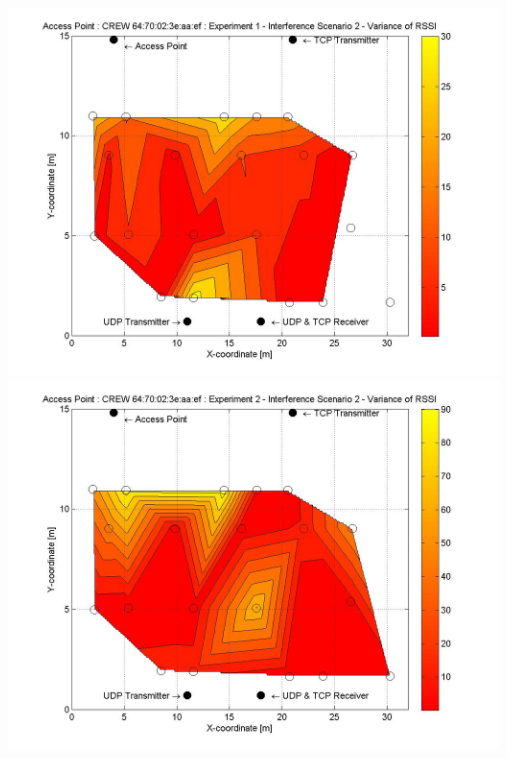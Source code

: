 \documentclass[11pt,a4paper,headinclude,footinclude,chapterprefix=on]{scrreprt}
\begin{document}
\begin{longtable}
	\includegraphics[width=13cm]{../../Source/plot/CREW_ef/ef_Wifi_Ex_1_Variance.jpg} \\
	\includegraphics[width=13cm]{../../Source/plot/CREW_ef/ef_Wifi_Ex_2_Variance.jpg} \\
\end{longtable}
\end{document}
